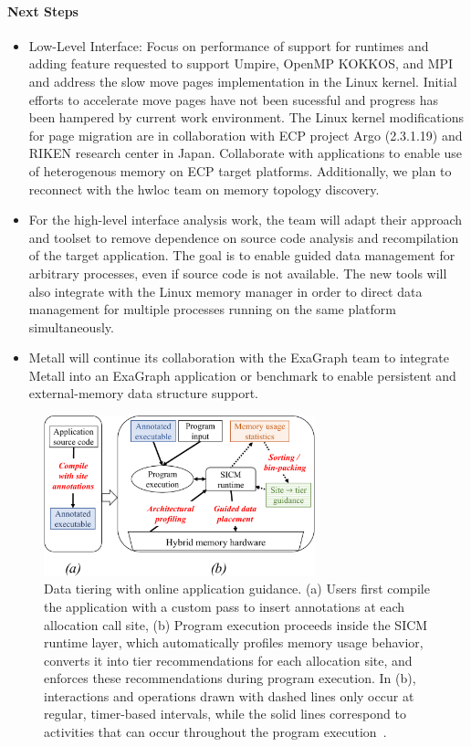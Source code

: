 \paragraph{Next Steps} \leavevmode 
\begin{itemize}
	\item  Low-Level Interface: Focus on performance of support for runtimes and adding feature requested to support Umpire, OpenMP KOKKOS, and MPI and address the slow move pages implementation in the Linux kernel. Initial efforts to accelerate move pages have not been sucessful and progress has been hampered by current work environment. The Linux kernel modifications for page migration are in collaboration with ECP project Argo (2.3.1.19) and RIKEN research center in Japan. Collaborate with applications to enable use of heterogenous memory on ECP target platforms. Additionally, we plan to reconnect with the hwloc team on memory topology discovery.
	\item For the high-level interface analysis work, the team will adapt their approach and toolset to remove dependence on source code analysis and recompilation of the target application. The goal is to enable guided data management for arbitrary processes, even if source code is not available. The new tools will also integrate with the Linux memory manager in order to direct data management for multiple processes running on the same platform simultaneously.
	\item Metall will continue its collaboration with the ExaGraph team to integrate Metall into an ExaGraph application or benchmark to enable persistent and external-memory data structure support.   
\end{itemize}

\begin{figure}[htb]
	\centering
	\includegraphics[width=0.7\textwidth]{projects/2.3.1-PMR/2.3.1.16-SICM/sicm-online-diagram.pdf}
	\caption{
		Data tiering with online application guidance. (a) Users first compile the application with a custom pass to insert annotations at each allocation call site, (b) Program execution proceeds inside the SICM runtime layer, which automatically profiles memory usage behavior, converts it into tier recommendations for each allocation site, and enforces these recommendations during program execution. In (b), interactions and operations drawn with dashed lines only occur at regular, timer-based intervals, while the solid lines correspond to activities that can occur throughout the program execution~\cite{olson2021online}.
		\label{fig:sicm-online}
	}
\end{figure}

